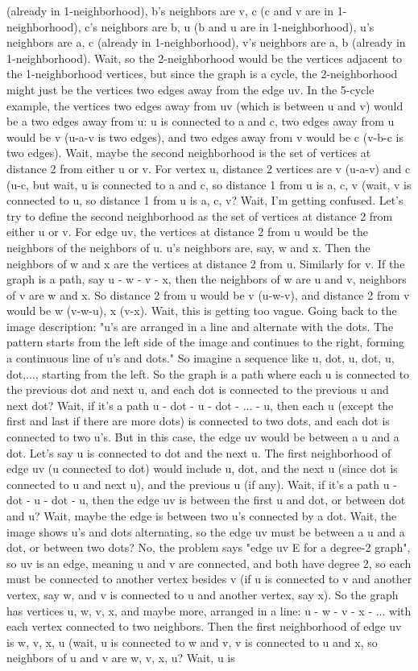 {(already in 1-neighborhood), b's neighbors are v, c (c and v are in 1-neighborhood), c's neighbors are b, u (b and u are in 1-neighborhood), u's neighbors are a, c (already in 1-neighborhood), v's neighbors are a, b (already in 1-neighborhood). Wait, so the 2-neighborhood would be the vertices adjacent to the 1-neighborhood vertices, but since the graph is a cycle, the 2-neighborhood might just be the vertices two edges away from the edge uv. In the 5-cycle example, the vertices two edges away from uv (which is between u and v) would be a two edges away from u: u is connected to a and c, two edges away from u would be v (u-a-v is two edges), and two edges away from v would be c (v-b-c is two edges). Wait, maybe the second neighborhood is the set of vertices at distance 2 from either u or v. For vertex u, distance 2 vertices are v (u-a-v) and c (u-c, but wait, u is connected to a and c, so distance 1 from u is a, c, v (wait, v is connected to u, so distance 1 from u is a, c, v? Wait, I'm getting confused. Let's try to define the second neighborhood as the set of vertices at distance 2 from either u or v. For edge uv, the vertices at distance 2 from u would be the neighbors of the neighbors of u. u's neighbors are, say, w and x. Then the neighbors of w and x are the vertices at distance 2 from u. Similarly for v. If the graph is a path, say u - w - v - x, then the neighbors of w are u and v, neighbors of v are w and x. So distance 2 from u would be v (u-w-v), and distance 2 from v would be w (v-w-u), x (v-x). Wait, this is getting too vague. Going back to the image description: "u's are arranged in a line and alternate with the dots. The pattern starts from the left side of the image and continues to the right, forming a continuous line of u's and dots." So imagine a sequence like u, dot, u, dot, u, dot,..., starting from the left. So the graph is a path where each u is connected to the previous dot and next u, and each dot is connected to the previous u and next dot? Wait, if it's a path u - dot - u - dot - ... - u, then each u (except the first and last if there are more dots) is connected to two dots, and each dot is connected to two u's. But in this case, the edge uv would be between a u and a dot. Let's say u is connected to dot and the next u. The first neighborhood of edge uv (u connected to dot) would include u, dot, and the next u (since dot is connected to u and next u), and the previous u (if any). Wait, if it's a path u - dot - u - dot - u, then the edge uv is between the first u and dot, or between dot and u? Wait, maybe the edge is between two u's connected by a dot. Wait, the image shows u's and dots alternating, so the edge uv must be between a u and a dot, or between two dots? No, the problem says "edge uv E for a degree-2 graph", so uv is an edge, meaning u and v are connected, and both have degree 2, so each must be connected to another vertex besides v (if u is connected to v and another vertex, say w, and v is connected to u and another vertex, say x). So the graph has vertices u, w, v, x, and maybe more, arranged in a line: u - w - v - x - ... with each vertex connected to two neighbors. Then the first neighborhood of edge uv is {w, v, x, u} (wait, u is connected to w and v, v is connected to u and x, so neighbors of u and v are w, v, x, u? Wait, u is }
